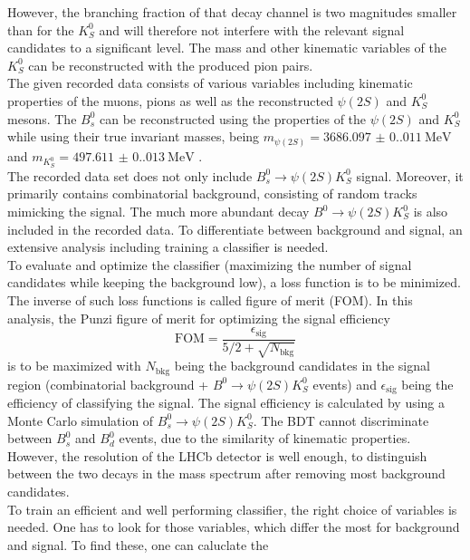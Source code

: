 However, the branching fraction of that decay channel is two magnitudes smaller than for the $K_S^0$ and will therefore not interfere with the relevant signal candidates to a significant level. The mass and other
kinematic variables of the $K_S^0$ can be reconstructed with the produced pion pairs.\\
The given recorded data consists of various variables including kinematic properties of the muons, pions as well as the reconstructed $\psi (2S)$ and $K_S^0$ mesons. The $B_s^0$ can be reconstructed using the
properties of the $\psi (2S)$ and $K_S^0$ while using their true invariant masses, being $m_{\psi (2S)} = \qty{3686.097(0.011)}{\mega\electronvolt}$ and $m_{K_S^0} = \qty{497.611(0.013)}{\mega\electronvolt}$ \cite{PDG}.\\
The recorded data set does not only include $B_s^0 \to \psi (2S)K_S^0$ signal. Moreover, it primarily contains combinatorial background, consisting of random tracks mimicking the signal. 
The much more abundant decay $B^0 \to \psi (2S)K_S^0$ is also included in the recorded data. To differentiate between background and signal, an extensive analysis including
training a classifier is needed.\\
To evaluate and optimize the classifier (maximizing the number of signal candidates while keeping the background low), a loss function is to be minimized. The inverse of such loss functions is called figure of merit (FOM).
In this analysis, the Punzi figure of merit for optimizing the signal efficiency
\begin{equation}
    \label{eq:FOM}
    \mathrm{FOM}  = \frac{\epsilon_{\mathrm{sig}}}{5/2 + \sqrt{N_{\mathrm{bkg}}}}
\end{equation}
is to be maximized with $N_{\mathrm{bkg}}$ being the background candidates in the signal region (combinatorial background + $B^0 \to \psi (2S)K_S^0$ events) and $\epsilon_{\mathrm{sig}}$ being the efficiency of classifying
the signal. The signal efficiency is calculated by using a Monte Carlo simulation of $B_s^0 \to \psi (2S)K_S^0$. The BDT cannot discriminate between $B_s^0$ and $B_d^0$ events, due to the similarity of kinematic
properties. However, the resolution of the LHCb detector is well enough, to distinguish between the two decays in the mass spectrum after removing most background candidates.\\
To train an efficient and well performing classifier, the right choice of variables is needed. One has to look for those variables, which differ the most for background and signal. To find these, one can caluclate the 
